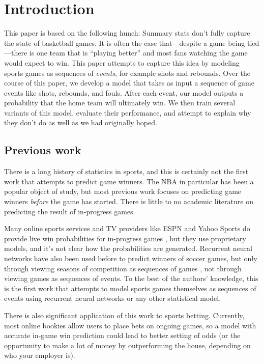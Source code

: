 \section{Introduction}

This paper is based on the following hunch: Summary stats don't fully capture the state of basketball games. It is often the case that---despite a game being tied---there is one team that is ``playing better'' and most fans watching the game would expect to win. This paper attempts to capture this idea by modeling sports games as sequences of \emph{events}, for example shots and rebounds. Over the course of this paper, we develop a model that takes as input a sequence of game events like shots, rebounds, and fouls. After each event, our model outputs a probability that the home team will ultimately win. We then train several variants of this model, evaluate their performance, and attempt to explain why they don't do as well as we had originally hoped.

\subsection{Previous work}

There is a long history of statistics in sports, and this is certainly not the first work that attempts to predict game winners. The NBA in particular has been a popular object of study, but most previous work \cite{nba-win-pred-1, nba-win-pred-2, nba-win-pred-3} focuses on predicting game winners \emph{before} the game has started. There is little to no academic literature on predicting the result of in-progress games.

Many online sports services and TV providers like ESPN and Yahoo Sports do provide live win probabilities for in-progress games \cite{espn-win-probability, opta-win-probability}, but they use proprietary models, and it's not clear how the probabilities are generated. Recurrent neural networks have also been used before to predict winners of soccer games, but only through viewing seasons of competition as sequences of games \cite{lstm-soccer-paper}, not through viewing games as sequences of events. To the best of the authors' knowledge, this is the first work that attempts to model sports games themselves as sequences of events using recurrent neural networks or any other statistical model.

There is also significant application of this work to sports betting. Currently, most online bookies \cite{draftkings-live} allow users to place bets on ongoing games, so a model with accurate in-game win prediction could lead to better setting of odds (or the opportunity to make a lot of money by outperforming the house, depending on who your employer is).

